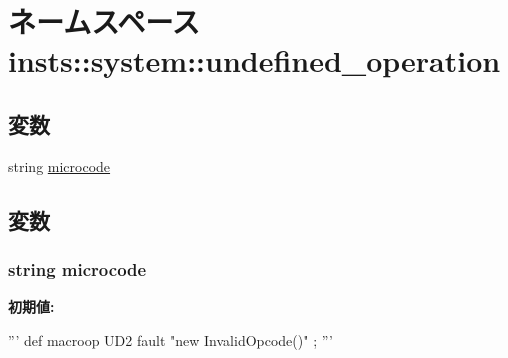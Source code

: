 \hypertarget{namespaceinsts_1_1system_1_1undefined__operation}{
\section{ネームスペース insts::system::undefined\_\-operation}
\label{namespaceinsts_1_1system_1_1undefined__operation}
}
\subsection*{変数}
\begin{DoxyCompactItemize}
\item 
string \hyperlink{namespaceinsts_1_1system_1_1undefined__operation_a770f11a173e99389a8802f0107ed8f52}{microcode}
\end{DoxyCompactItemize}


\subsection{変数}
\hypertarget{namespaceinsts_1_1system_1_1undefined__operation_a770f11a173e99389a8802f0107ed8f52}{
\subsubsection[{microcode}]{\setlength{\rightskip}{0pt plus 5cm}string {\bf microcode}}}
\label{namespaceinsts_1_1system_1_1undefined__operation_a770f11a173e99389a8802f0107ed8f52}
{\bfseries 初期値:}
\begin{DoxyCode}
'''
def macroop UD2
{
    fault "new InvalidOpcode()"
};
'''
\end{DoxyCode}
